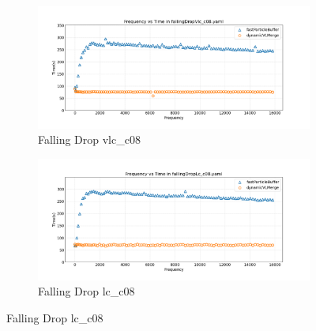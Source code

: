 \section{}

\begin{figure}[htbp]
    \centering
    \vspace{-0.5em}
    \begin{subfigure}[b]{\textwidth}
        \centering
        \includegraphics[width=0.9\linewidth]{graphs/fallingDrop/normalExperiments/freq/vlcc08.png}
        \vspace{-0.5em}
        \caption{\scriptsize Falling Drop vlc\_c08}
        \label{fig:vlcc08fallingDrop}
    \end{subfigure}

    \begin{subfigure}[b]{\textwidth}
        \centering
        \includegraphics[width=0.9\linewidth]{graphs/fallingDrop/normalExperiments/freq/lcc08.png}
        \vspace{-0.5em}
        \caption{\scriptsize Falling Drop lc\_c08}
        \label{fig:lcc08explodingLiquid}
    \end{subfigure}


\end{figure}
